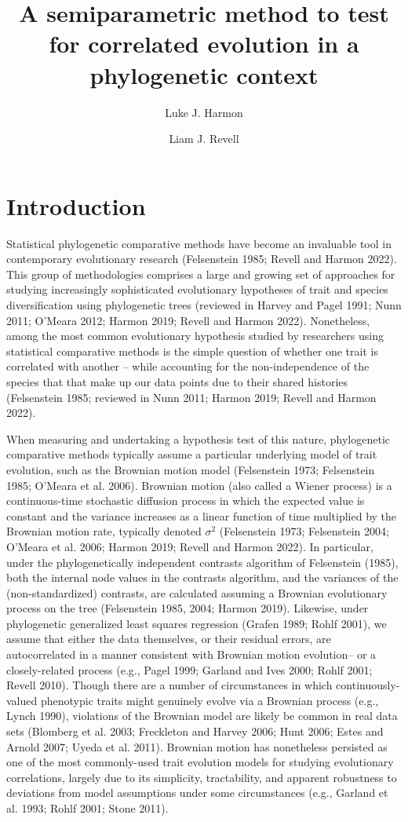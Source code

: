 \documentclass[fleqn,10pt,lineno]{wlpeerj} %
\title{A semiparametric method to test for correlated evolution in a phylogenetic context}
\author[1]{Luke J. Harmon}
\author[2]{Liam J. Revell}
\affil[1]{Department of Biological Sciences, University of Idaho, Moscow, ID, USA}
\affil[2]{Department of Biology, University of Massachusetts Boston, Boston, MA, USA}
\begin{document}
\flushbottom
\maketitle
\thispagestyle{empty}

\section{Introduction}\label{introduction}

Statistical phylogenetic comparative methods have become an invaluable tool in contemporary evolutionary research (Felsenstein 1985; Revell and Harmon 2022). This group of methodologies comprises a large and growing set of approaches for studying increasingly sophisticated evolutionary hypotheses of trait and species diversification using phylogenetic trees (reviewed in Harvey and Pagel 1991; Nunn 2011; O'Meara 2012; Harmon 2019; Revell and Harmon 2022). Nonetheless, among the most common evolutionary hypothesis studied by researchers using statistical comparative methods is the simple question of whether one trait is correlated with another -- while accounting for the non-independence of the species that that make up our data points due to their shared histories (Felsenstein 1985; reviewed in Nunn 2011; Harmon 2019; Revell and Harmon 2022).

When measuring and undertaking a hypothesis test of this nature, phylogenetic comparative methods typically assume a particular underlying model of trait evolution, such as the Brownian motion model (Felsenstein 1973; Felsenstein 1985; O'Meara et al. 2006). Brownian motion (also called a Wiener process) is a continuous-time stochastic diffusion process in which the expected value is constant and the variance increases as a linear function of time multiplied by the Brownian motion rate, typically denoted \(\sigma^2\) (Felsenstein 1973; Felsenstein 2004; O'Meara et al. 2006; Harmon 2019; Revell and Harmon 2022). In particular, under the phylogenetically independent contrasts algorithm of Felsenstein (1985), both the internal node values in the contrasts algorithm, and the variances of the (non-standardized) contrasts, are calculated assuming a Brownian evolutionary process on the tree (Felsenstein 1985, 2004; Harmon 2019). Likewise, under phylogenetic generalized least squares regression (Grafen 1989; Rohlf 2001), we assume that either the data themselves, or their residual errors, are autocorrelated in a manner consistent with Brownian motion evolution-- or a closely-related process (e.g., Pagel 1999; Garland and Ives 2000; Rohlf 2001; Revell 2010). Though there are a number of circumstances in which continuously-valued phenotypic traits might genuinely evolve via a Brownian process (e.g., Lynch 1990), violations of the Brownian model are likely be common in real data sets (Blomberg et al. 2003; Freckleton and Harvey 2006; Hunt 2006; Estes and Arnold 2007; Uyeda et al. 2011). Brownian motion has nonetheless persisted as one of the most commonly-used trait evolution models for studying evolutionary correlations, largely due to its simplicity, tractability, and apparent robustness to deviations from model assumptions under some circumstances (e.g., Garland et al. 1993; Rohlf 2001; Stone 2011).
\end{document}

